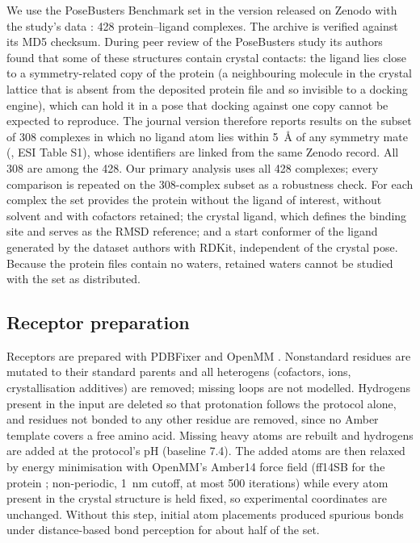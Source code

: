 We use the PoseBusters Benchmark set \citep{buttenschoen2024posebusters} in the version
released on Zenodo with the study's data \citep{posebusters2023data}: 428 protein--ligand
complexes. The archive is verified against its MD5 checksum. During peer review of the
PoseBusters study its authors found that some of these structures contain crystal contacts:
the ligand lies close to a symmetry-related copy of the protein (a neighbouring molecule in
the crystal lattice that is absent from the deposited protein file and so invisible to a
docking engine), which can hold it in a pose that docking against one copy cannot be
expected to reproduce. The journal version therefore reports results on the subset of 308
complexes in which no ligand atom lies within \SI{5}{\angstrom} of any symmetry mate
(\citealp{buttenschoen2024posebusters}, ESI Table S1), whose identifiers are linked from the
same Zenodo record. All 308 are among the 428. Our primary analysis uses
all 428 complexes; every comparison is repeated on the 308-complex subset as a robustness
check. For each complex the set provides the protein without
the ligand of interest, without solvent and with cofactors retained; the crystal ligand,
which defines the binding site and serves as the RMSD reference; and a start conformer of
the ligand generated by the dataset authors with RDKit, independent of the crystal pose.
Because the protein files contain no waters, retained waters cannot be studied with the set
as distributed.

\subsection{Receptor preparation}
\label{sec:receptor}

Receptors are prepared with PDBFixer and OpenMM \citep{eastman2024openmm}. Nonstandard
residues are mutated to their standard parents and all heterogens (cofactors, ions,
crystallisation additives) are removed; missing loops are not modelled. Hydrogens present in
the input are deleted so that protonation follows the protocol alone, and residues not
bonded to any other residue are removed, since no Amber template covers a free amino acid.
Missing heavy atoms are rebuilt and hydrogens are added at the protocol's pH (baseline 7.4).
The added atoms are then relaxed by energy minimisation with OpenMM's Amber14 force field
(ff14SB for the protein \citep{maier2015ff14sb}; non-periodic, \SI{1}{\nano\metre} cutoff, at most 500 iterations) while every atom present
in the crystal structure is held fixed, so experimental coordinates are unchanged.
Without this step, initial atom placements produced spurious bonds under distance-based bond
perception for about half of the set.

